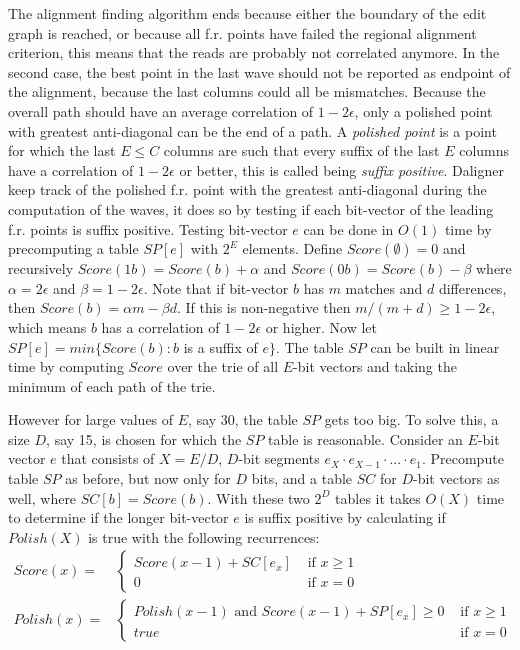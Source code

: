 \documentclass[../main/thesis.tex]{subfiles}
\begin{document}

The alignment finding algorithm ends because either the boundary of the edit graph is reached, or because all f.r. points have failed the regional alignment criterion, this means that the reads are probably not correlated anymore.
In the second case, the best point in the last wave should not be reported as endpoint of the alignment, because the last columns could all be mismatches.
Because the overall path should have an average correlation of $1-2\epsilon$, only a polished point with greatest anti-diagonal can be the end of a path.
A \textit{polished point} is a point for which the last $E\le C$ columns are such that every suffix of the last $E$ columns have a correlation of $1-2\epsilon$ or better, this is called being \textit{suffix positive}.
Daligner keep track of the polished f.r. point with the greatest anti-diagonal during the computation of the waves, it does so by testing if each bit-vector of the leading f.r. points is suffix positive.
Testing bit-vector $e$ can be done in $O(1)$ time by precomputing a table $SP[e]$ with $2^E$ elements.
Define $Score(\emptyset)=0$ and recursively $Score(1b) = Score(b) + \alpha$ and $Score(0b) = Score(b) - \beta$ where $\alpha = 2\epsilon$ and $\beta = 1-2\epsilon$.
Note that if bit-vector $b$ has $m$ matches and $d$ differences, then $Score(b) = \alpha m - \beta d$.
If this is non-negative then $m/(m+d) \ge 1-2\epsilon$, which means $b$ has a correlation of $1-2\epsilon$ or higher.
Now let $SP[e] = min\{Score(b): b$ is a suffix of $e\}$.
The table $SP$ can be built in linear time by computing $Score$ over the trie \cite{trie1}\cite{trie2} of all $E$-bit vectors and taking the minimum of each path of the trie.

However for large values of $E$, say 30, the table $SP$ gets too big.
To solve this, a size $D$, say 15, is chosen for which the $SP$ table is reasonable.
Consider an $E$-bit vector $e$ that consists of $X=E/D$, $D$-bit segments $e_X\cdot e_{X-1}\cdot ... \cdot e_1$.
Precompute table $SP$ as before, but now only for $D$ bits, and a table $SC$ for $D$-bit vectors as well, where $SC[b] = Score(b)$.
With these two $2^D$ tables it takes $O(X)$ time to determine if the longer bit-vector $e$ is suffix positive by calculating if $Polish(X)$ is true with the following recurrences:
\begin{align}
Score(x) = &\begin{cases}
Score(x-1) + SC[e_x] &\text{ if } x \ge 1 \\
0&\text{ if } x = 0
\end{cases} \\
Polish(x) = &\begin{cases}
Polish(x-1) \text{ and } Score(x-1) + SP[e_x] \ge 0 &\text{ if } x \ge 1 \\
true &\text{ if } x = 0
\end{cases}
\end{align}
\end{document}
